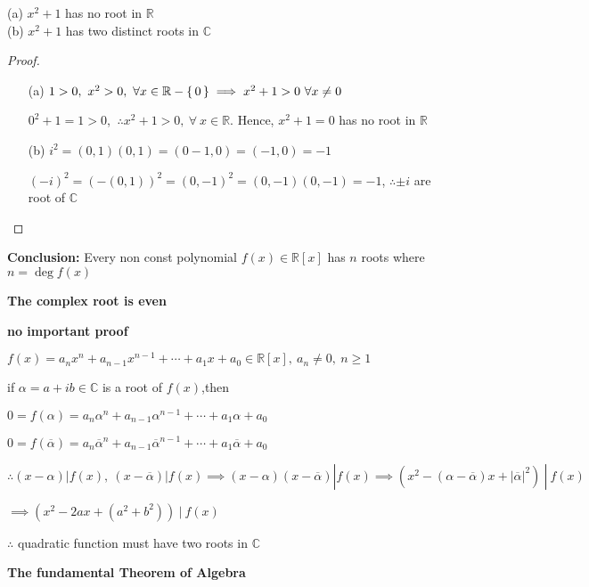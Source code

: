 \begin{thm*}  $ $\\
		(a) $x^2 + 1$ has no root in $\mathbb R$\\
		(b) $x^2 + 1$ has two distinct roots in $\mathbb C$
\end{thm*}

\newpage

\begin{proof}$ $
	\begin{enumerate}
		\item[(a)] $1>0,~x^2>0,~\forall x \in \mathbb R - \left\{ \,0 \,\right\} \implies x^2 + 1 > 0 ~\forall x \neq 0$ 
		
		$0^2 + 1 = 1 > 0$, $~\therefore x^2 + 1 > 0 ,~\forall~ x \in \mathbb R$. Hence, $x^2 + 1 = 0$ has no root in $\mathbb R$
		\item[(b)] $i^2 = (0,1)(0,1) = (0-1,0) = (-1,0) = -1$
		
		$(-i)^2 = (-(0,1))^2 = (0,-1)^2 = (0,-1)(0,-1) = -1$, $\therefore \pm i$ are root of $\mathbb C$
	\end{enumerate}
\end{proof}

\textbf{Conclusion:} Every non const polynomial $f(x) \in \mathbb R[x]$ has $n$ roots where $n = \deg f(x)$


\textbf{The complex root is even}
\begin{tcolorbox}
	\textbf{\color{blue} no important proof} 
	
	$f(x) = a_nx^n + a_{n-1}x^{n-1}+\cdots+a_1x+a_0 \in \mathbb R[x],~a_n \neq 0,~n\geq 1$
	
	if $\alpha = a+ib \in \mathbb C$ is a root of $f(x)$,then
	
	$0 = f(\alpha) = a_n\alpha^n + a_{n-1}\alpha^{n-1}+\cdots + a_1\alpha + a_0$
	
	$0 = f(\overline{\alpha}) = a_n\overline{\alpha}^n + a_{n-1}\overline{\alpha}^{n-1}+\cdots+a_1\overline{\alpha} + a_0$
	
	$\therefore (x - \alpha)|f(x),~(x-\overline{\alpha})|f(x) \implies (x-\alpha)(x-\overline{\alpha})|f(x) \implies (x^2 - (\alpha - \overline{\alpha})x + |\overline{\alpha}|^2)~|~f(x)$
	
	$\implies (x^2 - 2ax +(a^2+b^2))~|~f(x)$
	
	$\therefore$ quadratic function must have two roots in $\mathbb C$
\end{tcolorbox}

\textbf{The fundamental Theorem of Algebra}

